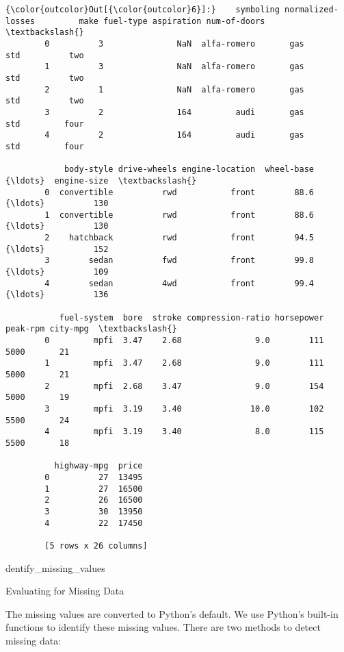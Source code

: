 \documentclass[11pt]{article}
\begin{document}
\begin{Verbatim}[commandchars=\\\{\}]
{\color{outcolor}Out[{\color{outcolor}6}]:}    symboling normalized-losses         make fuel-type aspiration num-of-doors  \textbackslash{}
        0          3               NaN  alfa-romero       gas        std          two   
        1          3               NaN  alfa-romero       gas        std          two   
        2          1               NaN  alfa-romero       gas        std          two   
        3          2               164         audi       gas        std         four   
        4          2               164         audi       gas        std         four   
        
            body-style drive-wheels engine-location  wheel-base  {\ldots}  engine-size  \textbackslash{}
        0  convertible          rwd           front        88.6  {\ldots}          130   
        1  convertible          rwd           front        88.6  {\ldots}          130   
        2    hatchback          rwd           front        94.5  {\ldots}          152   
        3        sedan          fwd           front        99.8  {\ldots}          109   
        4        sedan          4wd           front        99.4  {\ldots}          136   
        
           fuel-system  bore  stroke compression-ratio horsepower  peak-rpm city-mpg  \textbackslash{}
        0         mpfi  3.47    2.68               9.0        111      5000       21   
        1         mpfi  3.47    2.68               9.0        111      5000       21   
        2         mpfi  2.68    3.47               9.0        154      5000       19   
        3         mpfi  3.19    3.40              10.0        102      5500       24   
        4         mpfi  3.19    3.40               8.0        115      5500       18   
        
          highway-mpg  price  
        0          27  13495  
        1          27  16500  
        2          26  16500  
        3          30  13950  
        4          22  17450  
        
        [5 rows x 26 columns]
\end{Verbatim}
            
    dentify\_missing\_values

Evaluating for Missing Data

The missing values are converted to Python's default. We use Python's
built-in functions to identify these missing values. There are two
methods to detect missing data:
\end{document}
